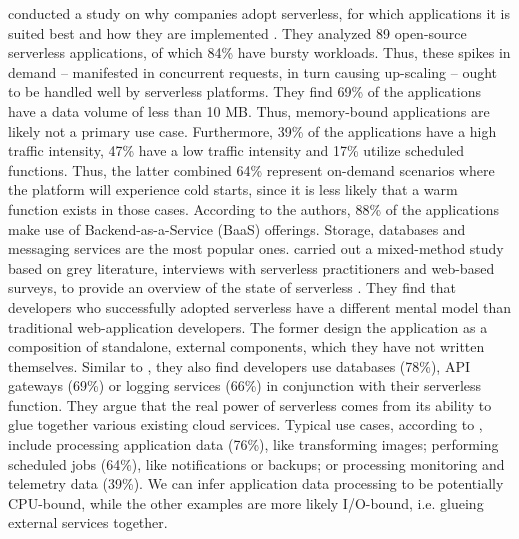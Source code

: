 \citeauthor{Eismann2021} conducted a study on why companies adopt serverless, for which applications it is suited best and how they are implemented \cite{Eismann2021}. They analyzed 89 open-source serverless applications, of which 84\% have bursty workloads. Thus, these spikes in demand -- manifested in concurrent requests, in turn causing up-scaling -- ought to be handled well by serverless platforms.
They find 69\% of the applications have a data volume of less than 10 MB. Thus, memory-bound applications are likely not a primary use case. Furthermore, 39\% of the applications have a high traffic intensity, 47\% have a low traffic intensity and 17\% utilize scheduled functions. Thus, the latter combined 64\% represent on-demand scenarios where the platform will experience cold starts, since it is less likely that a warm function exists in those cases. According to the authors, 88\% of the applications make use of Backend-as-a-Service (BaaS) offerings. Storage, databases and messaging services are the most popular ones.
\citeauthor{Leitner2019} carried out a mixed-method study based on grey literature, interviews with serverless practitioners and web-based surveys, to provide an overview of the state of serverless \cite{Leitner2019}. They find that developers who successfully adopted serverless have a different mental model than traditional web-application developers. The former design the application as a composition of standalone, external components, which they have not written themselves. Similar to \citeauthor{Eismann2021}, they also find developers use databases (78\%), API gateways (69\%) or logging services (66\%) in conjunction with their serverless function. They argue that the real power of serverless comes from its ability to glue together various existing cloud services.
Typical use cases, according to \citeauthor{Leitner2019}, include processing application data (76\%), like transforming images; performing scheduled jobs (64\%), like notifications or backups; or processing monitoring and telemetry data (39\%). We can infer application data processing to be potentially CPU-bound, while the other examples are more likely I/O-bound, i.e. glueing external services together.

